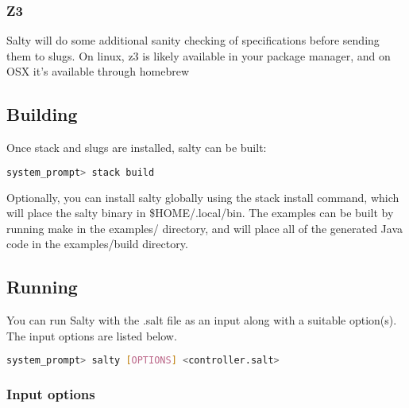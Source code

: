 \subsubsection{Z3}

Salty will do some additional sanity checking of specifications before sending them to slugs. On linux, z3 is likely available in your package manager, and on OSX it's available through homebrew

\subsection{Building}

Once stack and slugs are installed, salty can be built:

\begin{lstlisting}[language=bash]
system_prompt> stack build
\end{lstlisting}

Optionally, you can install salty globally using the stack install command, which will place the salty binary in \$HOME/.local/bin.
The examples can be built by running make in the examples/ directory, and will place all of the generated Java code in the examples/build directory.

\subsection{Running}

You can run Salty with the .salt file as an input along with a suitable option(s). The input options are listed below.

\begin{lstlisting}[language=bash]
system_prompt> salty [OPTIONS] <controller.salt>
\end{lstlisting}

\subsubsection{Input options}

